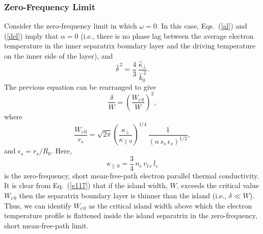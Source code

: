 \documentclass[12pt,prb,aps]{revtex4-1}
\begin{document}
\subsubsection{Zero-Frequency Limit}
Consider the zero-frequency limit in which $\omega=0$. In this case, Eqs.~(\ref{al}) and (\ref{del}) imply that $\alpha=0$ (i.e., there is no phase lag between the average
electron temperature in the inner separatrix boundary layer and the driving temperature on the inner side of the layer), and
\begin{equation}
\hat{\delta}^{\,2} = \frac{4}{3}\,\frac{\hat{\kappa}_\perp}{\hat{k}_0^{\,2}}.
\end{equation}
The previous equation can be rearranged to give
\begin{equation}\label{e117}
\frac{\delta}{W} = \left(\frac{W_{c\,0}}{W}\right)^2,
\end{equation}
where\,\cite{rf}
\begin{equation}\label{wc0}
\frac{W_{c\,0}}{r_s} =
\sqrt{2\pi}\left(\frac{\kappa_\perp}{\kappa_{\parallel\,0}}\right)^{1/4}\,\frac{1}{(n\,s_s\,\epsilon_s)^{1/2}},
\end{equation}
and $\epsilon_s=r_s/R_0$. Here, 
\begin{equation}
\kappa_{\parallel\,0} = \frac{3}{4}\,n_e\,v_{t\,e}\,l_e
\end{equation}
is the zero-frequency, short mean-free-path electron parallel thermal conductivity.\cite{fitz,brag} It is clear from Eq.~(\ref{e117}) that if the island width, $W$,
exceeds the critical value $W_{c\,0}$ then the separatrix boundary layer is thinner than the island (i.e., $\delta\ll W$). Thus, we
can identify $W_{c\,0}$ as the critical island width above which the electron temperature profile is flattened inside the island separatrix
in the zero-frequency, short mean-free-path  limit.
\end{document}
